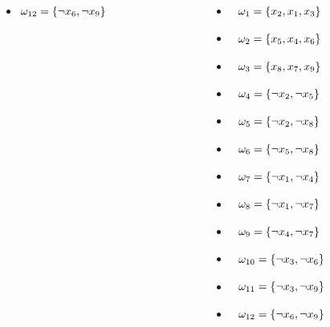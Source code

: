 \documentclass{beamer}
\begin{document}
\begin{frame}
{\begin{columns}[t]
\begin{column}[T]{.3\textwidth}
\begin{itemize}
		\item[] $\omega_{12} = \{\neg x_6  ,  \neg x_9\} \tikz[baseline]{\node[anchor=base] (a12){};}$
		\end{itemize}
		\end{column}
		\begin{column}[T]{.3\textwidth}
		\tiny
		\begin{itemize}
		\item[] $\tikz[baseline]{\node[anchor=base] (b1){};} \omega_{1} = \{x_2  ,  x_1  ,  x_3\}$
		\item[] $\tikz[baseline]{\node[anchor=base] (b2){};} \omega_{2} = \{x_5  ,  x_4  ,  x_6\} $
		\item[] $\tikz[baseline]{\node[anchor=base] (b3){};} \omega_{3} = \{x_8  ,  x_7  ,  x_9\} $
		\item[] $\tikz[baseline]{\node[anchor=base] (b4){};} \omega_{4} = \{\neg x_2  ,  \neg x_5\} $
		\item[] $\tikz[baseline]{\node[anchor=base] (b5){};} \omega_{5} = \{\neg x_2  ,  \neg x_8\} $
		\item[] $\tikz[baseline]{\node[anchor=base] (b6){};} \omega_{6} = \{\neg x_5  ,  \neg x_8\} $
		\item[] $\tikz[baseline]{\node[anchor=base] (b7){};} \omega_{7} = \{\neg x_1  ,  \neg x_4\} $
		\item[] $\tikz[baseline]{\node[anchor=base] (b8){};} \omega_{8} = \{\neg x_1  ,  \neg x_7\} $
		\item[] $\tikz[baseline]{\node[anchor=base] (b9){};} \omega_{9} = \{\neg x_4  ,  \neg x_7\} $
		\item[] $\tikz[baseline]{\node[anchor=base] (b10){};} \omega_{10} = \{\neg x_3  ,  \neg x_6\} $
		\item[] $\tikz[baseline]{\node[anchor=base] (b11){};} \omega_{11} = \{\neg x_3  ,  \neg x_9\} $
		\item[] $\tikz[baseline]{\node[anchor=base] (b12){};} \omega_{12} = \{\neg x_6  ,  \neg x_9\} $
	\end{itemize}
	\end{column}
\end{columns}

}
\end{frame}
\end{document}
